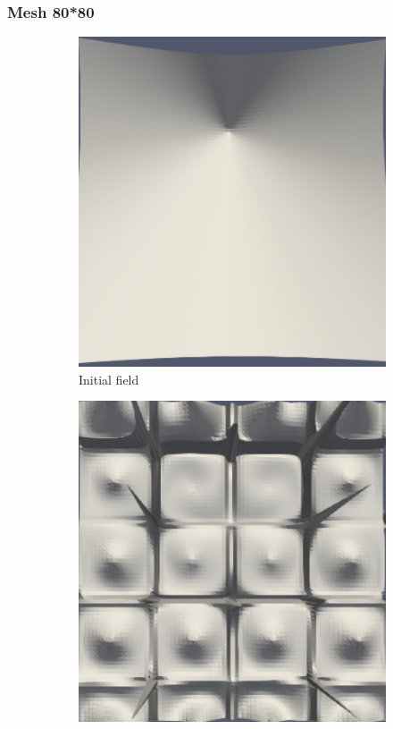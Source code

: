 \documentclass{article}
\begin{document}
\subsubsection{Mesh 80*80}
\begin{figure}[hbt!]
  \begin{subfigure}{0.4\textwidth}
        \centering
        \includegraphics[width=\textwidth]{Figures/e-5 80x80/for n1 .png}
        \caption{Initial field}
  \end{subfigure}
  \hfill
  \begin{subfigure}{0.4\textwidth}
        \centering
        \includegraphics[width=\textwidth]{Figures/e-5 80x80/for n 100.png}

\end{subfigure}
\end{figure}
\end{document}
